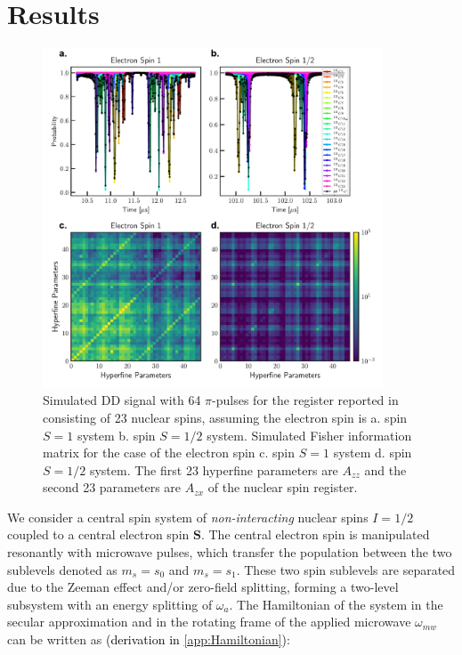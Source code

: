 \documentclass[%
 reprint,
superscriptaddress,
 amsmath,amssymb,
 aps,
]{revtex4-2}
\begin{document}
\section{Results}
\label{sec:theory}
\begin{figure}%
	\begin{center}
		\includegraphics[width=0.9\textwidth]{figure_1.pdf}
		\caption{Simulated DD signal with 64 $\pi$-pulses for the register reported in  \cite{abobeih2019atomic} consisting of 23 nuclear spins, assuming the electron spin is a. spin $S=1$ system b. spin $S=1/2$ system. Simulated Fisher information matrix for the case of the electron spin c. spin $S=1$ system d. spin $S=1/2$ system. The first 23 hyperfine parameters are $A_{zz}$ and the second 23 parameters are $A_{zx}$ of the nuclear spin register.}
		\label{fig:3}
	\end{center}
\end{figure}
We consider a central spin system of \textit{non-interacting} nuclear spins $I=1/2$ coupled to a central electron spin $\boldsymbol{S}$.
The central electron spin is manipulated resonantly with microwave pulses, which transfer the population between the two sublevels denoted as $m_s=s_0$ and $m_s = s_1$.
These two spin sublevels are separated due to the Zeeman effect and/or zero-field splitting, forming a two-level subsystem with an energy splitting of $\omega_a$.
The Hamiltonian of the system in the secular approximation and in the rotating frame of the applied microwave $\omega_{mw}$ can be written as \textcolor{black}{(derivation in \ref{app:Hamiltonian})}:
\end{document}
